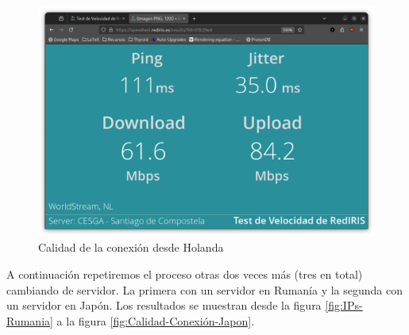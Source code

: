 \begin{figure}[H]
    \centering
    \includegraphics[width=\linewidth]{CalidadConexion-Holanda.png}
    \caption{Calidad de la conexión desde Holanda}
    \label{fig:Calidad-Conexión-Holanda}
\end{figure}


A continuación repetiremos el proceso otras dos veces más (tres en total) cambiando de servidor. La primera con un servidor en Rumanía y la segunda con un servidor en Japón.
Los resultados se muestran desde la figura \ref{fig:IPs-Rumania} a la figura \ref{fig:Calidad-Conexión-Japon}.


